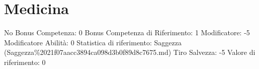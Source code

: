 \section{Medicina}\label{medicina}

\begin{description}
\tightlist
\item[Tags: ABI]
No Bonus Competenza: 0 Bonus Competenza di Riferimento: 1 Modificatore:
-5 Modificatore Abilità: 0 Statistica di riferimento: Saggezza
(Saggezza\%2021f07aacc3894ca098d3b0f89d8c7675.md) Tiro Salvezza: -5
Valore di riferimento: 0
\end{description}
